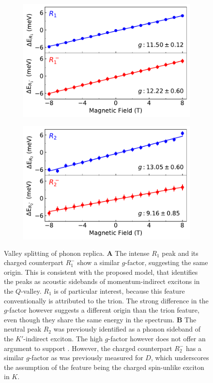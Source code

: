 \begin{figure}[t]
	\begin{subfigure}{0.49\textwidth}
		\caption{}
		\includegraphics[width=\textwidth]{G_R1}
	\end{subfigure}
	\begin{subfigure}{0.49\textwidth}
		\caption{}
		\includegraphics[width=\textwidth]{G_R2}
	\end{subfigure}
	\caption{Valley splitting of phonon replica. \textbf{A} The intense $R_1$ peak and its charged counterpart $R^-_1$ show a similar $g$-factor, suggesting the same origin. This is consistent with the proposed model, that identifies the peaks as acoustic sidebands of momentum-indirect excitons in the $Q$-valley. $R_1$ is of particular interest, because this feature conventionally is attributed to the trion. The strong difference in the $g$-factor however suggests a different origin than the trion feature, even though they share the same energy in the spectrum. \textbf{B} The neutral peak $R_2$ was previously identified as a phonon sideband of the $K'$-indirect exciton. The high $g$-factor however does not offer an argument to support . However, the charged counterpart $R^-_2$ has a similar $g$-factor as was previously measured for $D$, which underscores the assumption of the feature being the charged spin-unlike exciton in $K$. } 
	\label{R_fits}
\end{figure}


